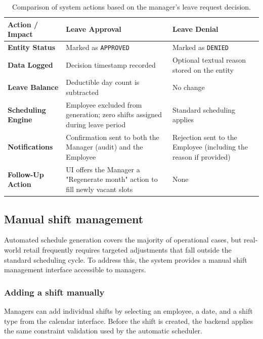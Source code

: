 \vspace{1.5em}
\begin{table}[h!]
    \centering
    \renewcommand{\arraystretch}{1.5} %
    \begin{tabular}{|l|p{6cm}|p{6cm}|}
        \hline
        \textbf{Action / Impact} & \textbf{Leave Approval} & \textbf{Leave Denial} \\ \hline
        \textbf{Entity Status} & Marked as \texttt{APPROVED} & Marked as \texttt{DENIED} \\ \hline
        \textbf{Data Logged} & Decision timestamp recorded & Optional textual reason stored on the entity \\ \hline
        \textbf{Leave Balance} & Deductible day count is subtracted & No change \\ \hline
        \textbf{Scheduling Engine} & Employee excluded from generation; zero shifts assigned during leave period & Standard scheduling applies \\ \hline
        \textbf{Notifications} & Confirmation sent to both the Manager (audit) and the Employee & Rejection sent to the Employee (including the reason if provided) \\ \hline
        \textbf{Follow-Up Action} & UI offers the Manager a "Regenerate month" action to fill newly vacant slots & None \\ \hline
    \end{tabular}
    \caption{Comparison of system actions based on the manager's leave request decision.}
    \label{tab:leave_decision_matrix}
\end{table}
\vspace{1.5em}

\subsection{Manual shift management}
\par Automated schedule generation covers the majority of operational cases, but real-world retail frequently requires targeted adjustments that fall outside the standard scheduling cycle. To address this, the system provides a manual shift management interface accessible to managers.

\subsubsection*{Adding a shift manually}
\par Managers can add individual shifts by selecting an employee, a date, and a shift type from the calendar interface. Before the shift is created, the backend applies the same constraint validation used by the automatic scheduler.

